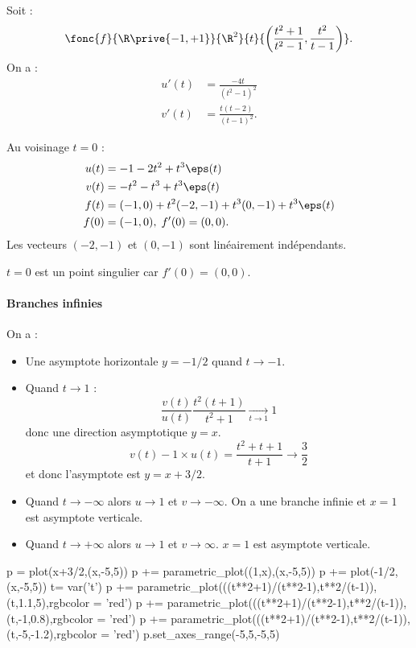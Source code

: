 \documentclass{mybourbaki}
\begin{document}
Soit : \[ \fonc{f}{\R\prive{-1,+1}}{\R^{2}}{t}{\left(\frac{t^{2}+1}{t^{2}-1},\frac{t^{2}}{t-1}\right)}.\]
On a :
\begin{align*}
u'(t) &= \frac{-4t}{(t^{2}-1)^{2}}\\
v'(t) &= \frac{t(t-2)}{(t-1)^{2}}.
\end{align*}

Au voisinage $t=0$ :
\begin{align*}
u(t) &= -1-2t^{2}+t^{3}\eps(t) \\
v(t) &= -t^{2}-t^{3}+t^{3}\eps(t)\\
f(t) &= (-1,0) + t^{2}(-2,-1) + t^{3}(0,-1) + t^{3}\eps(t)\\
f(0) &= (-1,0), \; f'(0)= (0,0).
\end{align*}
Les vecteurs $(-2,-1)$ et $(0,-1)$ sont linéairement indépendants.


$t=0$ est un point singulier car $f'(0) = (0,0)$.
\paragraph{Branches infinies}On a :
\begin{itemize}
\item Une asymptote horizontale $y = -1/2$ quand $t\to -1$.
\item Quand $t\to 1$ : \[ \frac{v(t)}{u(t)} \frac{t^{2}(t+1)}{t^{2}+1} \underset{t\to 1}{\longrightarrow} 1\]donc une direction asymptotique $y=x$. \[ v(t) - 1\times u(t) = \frac{t^{2}+t+1}{t+1}\to \frac{3}{2}\]et donc l'asymptote est $y=x+3/2$.
\item Quand $t\to-\infty$ alors $u\to 1$ et $v\to-\infty$. On a une branche infinie et $x=1$ est asymptote verticale.
\item Quand $t\to+\infty$ alors $u\to 1$ et $v\to \infty$. $x=1$ est asymptote verticale.
\end{itemize}

\begin{sagesilent}
p = plot(x+3/2,(x,-5,5))
p += parametric_plot((1,x),(x,-5,5))
p += plot(-1/2,(x,-5,5))
t= var('t')
p += parametric_plot(((t**2+1)/(t**2-1),t**2/(t-1)),(t,1.1,5),rgbcolor = 'red')
p += parametric_plot(((t**2+1)/(t**2-1),t**2/(t-1)),(t,-1,0.8),rgbcolor = 'red')
p += parametric_plot(((t**2+1)/(t**2-1),t**2/(t-1)),(t,-5,-1.2),rgbcolor = 'red')
p.set_axes_range(-5,5,-5,5)
\end{sagesilent}
\begin{center}
\end{center}
\end{document}
